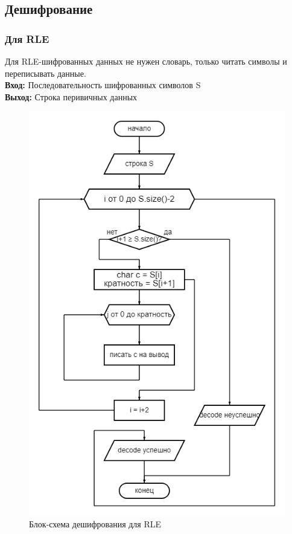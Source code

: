\documentclass[12pt]{article} %
\begin{document}
\subsection{Дешифрование}
\subsubsection{Для RLE}
Для RLE-шифрованных данных не нужен словарь, только читать символы и переписывать данные.\\ 
\textbf{Вход: }Последовательность шифрованных символов S\\
\textbf{Выход: }Строка перивичных данных \\
 \begin{figure}[H]
\centering \includegraphics[scale =0.4]{decoderle.png}
\caption{Блок-схема дешифрования для RLE}
\end{figure}
\end{document}
